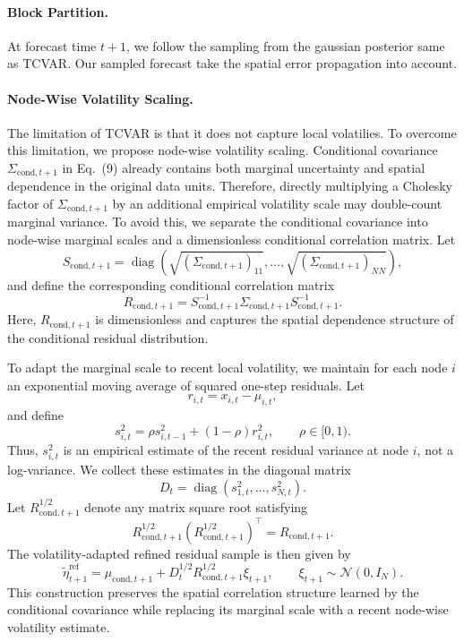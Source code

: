 \documentclass{article}
\theoremstyle{plain}
\theoremstyle{definition}
\theoremstyle{remark}
\begin{document}
\paragraph{Block Partition.}
At forecast time $t+1$, we follow the sampling from the gaussian posterior same as TCVAR\cite{zheng2024multivariateprobabilistictimeseries}. Our sampled forecast take the spatial error propagation into account.


\paragraph{Node-Wise Volatility Scaling.}
The limitation of TCVAR is that it does not capture local volatilies. To overcome this limitation, we propose node-wise volatility scaling. Conditional covariance $\Sigma_{\mathrm{cond},t+1}$ in Eq.~(9) already contains both
marginal uncertainty and spatial dependence in the original data units. Therefore, directly
multiplying a Cholesky factor of $\Sigma_{\mathrm{cond},t+1}$ by an additional empirical
volatility scale may double-count marginal variance. To avoid this, we separate the conditional
covariance into node-wise marginal scales and a dimensionless conditional correlation matrix. Let
\[
S_{\mathrm{cond},t+1}
=
\operatorname{diag}\left(
\sqrt{(\Sigma_{\mathrm{cond},t+1})_{11}},
\ldots,
\sqrt{(\Sigma_{\mathrm{cond},t+1})_{NN}}
\right),
\]
and define the corresponding conditional correlation matrix
\[
R_{\mathrm{cond},t+1}
=
S_{\mathrm{cond},t+1}^{-1}
\Sigma_{\mathrm{cond},t+1}
S_{\mathrm{cond},t+1}^{-1}.
\]
Here, $R_{\mathrm{cond},t+1}$ is dimensionless and captures the spatial dependence structure
of the conditional residual distribution.

To adapt the marginal scale to recent local volatility, we maintain for each node $i$ an
exponential moving average of squared one-step residuals. Let
\[
r_{i,t}=x_{i,t}-\mu_{i,t},
\]
and define
\[
s_{i,t}^{2}
=
\rho s_{i,t-1}^{2}
+
(1-\rho) r_{i,t}^{2},
\qquad
\rho \in [0,1).
\]
Thus, $s_{i,t}^{2}$ is an empirical estimate of the recent residual variance at node $i$,
not a log-variance. We collect these estimates in the diagonal matrix
\[
D_t
=
\operatorname{diag}(s_{1,t}^{2},\ldots,s_{N,t}^{2}).
\]
Let $R_{\mathrm{cond},t+1}^{1/2}$ denote any matrix square root satisfying
\[
R_{\mathrm{cond},t+1}^{1/2}
\left(R_{\mathrm{cond},t+1}^{1/2}\right)^{\top}
=
R_{\mathrm{cond},t+1}.
\]
The volatility-adapted refined residual sample is then given by
\[
\tilde{\eta}^{\mathrm{ref}}_{t+1}
=
\mu_{\mathrm{cond},t+1}
+
D_t^{1/2}
R_{\mathrm{cond},t+1}^{1/2}
\xi_{t+1},
\qquad
\xi_{t+1}\sim\mathcal{N}(0,I_N).
\tag{10}
\]
This construction preserves the spatial correlation structure learned by the conditional covariance
while replacing its marginal scale with a recent node-wise volatility estimate.
\end{document}
